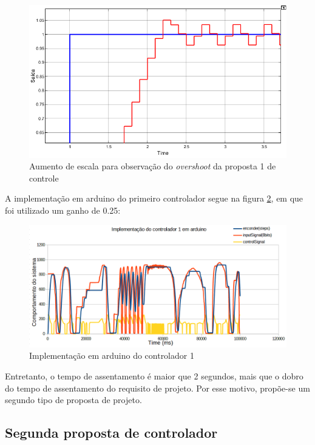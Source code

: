 \documentclass[a4paper,11pt]{article}
\begin{document}
\begin{figure}[H]
    \centering
    \includegraphics[width=\linewidth]{src/tex/img/saida_controle1_up.PNG}
    \caption{Aumento de escala para observação do \textit{overshoot} da proposta 1 de controle}
    \label{fig:saidactrl1up}
\end{figure}

A implementação em arduino do primeiro controlador segue na figura \ref{fig:resultadoctrl1}, em que foi utilizado um ganho de 0.25:

\begin{figure}[H]
    \centering
    \includegraphics[width=\linewidth]{src/tex/img/resultado_controle_1_implem.PNG}
    \caption{Implementação em arduino do controlador 1}
    \label{fig:resultadoctrl1}
\end{figure}

 Entretanto, o tempo de assentamento é maior que 2 segundos, mais que o dobro do tempo de assentamento do requisito de projeto. Por esse motivo, propõe-se um segundo tipo de proposta de projeto. 

\subsection{Segunda proposta de controlador}
\end{document}
